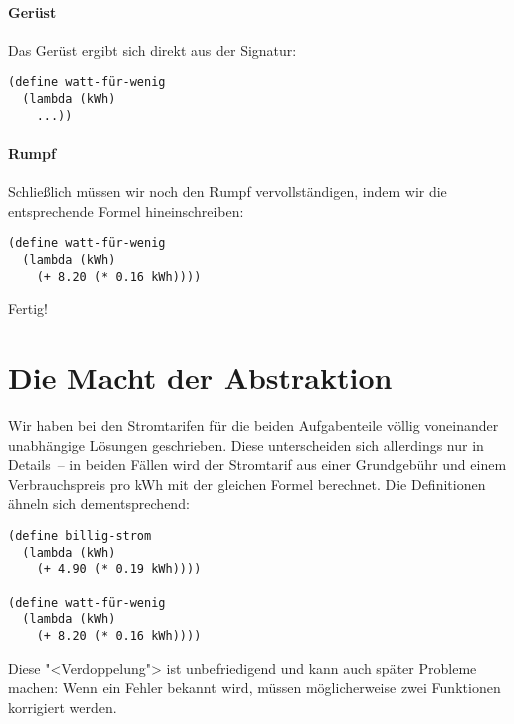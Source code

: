\paragraph{Gerüst}

Das Gerüst ergibt sich direkt aus der Signatur:
%
\begin{lstlisting}
(define watt-für-wenig
  (lambda (kWh)
    ...))
\end{lstlisting}

\paragraph{Rumpf}

Schließlich müssen wir noch den Rumpf vervollständigen, indem wir die
entsprechende Formel hineinschreiben:
%
\begin{lstlisting}
(define watt-für-wenig
  (lambda (kWh)
    (+ 8.20 (* 0.16 kWh))))
\end{lstlisting}
%
Fertig!

\section{Die Macht der Abstraktion}
\label{sec:abstraktion}

Wir haben bei den Stromtarifen für die beiden
Aufgabenteile völlig voneinander unabhängige Lösungen geschrieben.
Diese unterscheiden sich allerdings nur in Details~-- in beiden Fällen
wird der Stromtarif aus einer Grundgebühr und einem Verbrauchspreis
pro kWh mit der gleichen Formel berechnet.  Die Definitionen ähneln
sich dementsprechend:
%
\begin{lstlisting}
(define billig-strom
  (lambda (kWh)
    (+ 4.90 (* 0.19 kWh))))

(define watt-für-wenig
  (lambda (kWh)
    (+ 8.20 (* 0.16 kWh))))
\end{lstlisting}
%
Diese "<Verdoppelung"> ist unbefriedigend und kann auch später
Probleme machen: Wenn ein Fehler bekannt wird, müssen möglicherweise
zwei Funktionen korrigiert werden.

